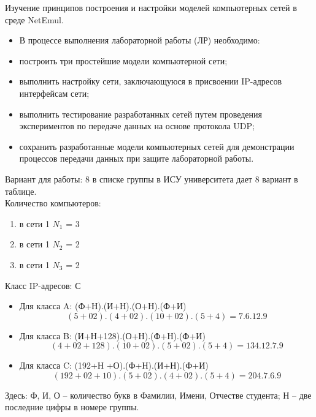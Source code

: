 


\tableofcontents


\newpage
\Chapter{\lab\ \labnumber}{\labtheme}{}

Изучение принципов построения и настройки моделей компьютерных 
сетей в среде NetEmul.
\begin{itemize}
    \item  В процессе выполнения лабораторной работы (ЛР) необходимо:
\item построить три простейшие модели компьютерной сети;
\item выполнить настройку сети, заключающуюся в присвоении IP-адресов 
интерфейсам сети;
\item выполнить тестирование разработанных сетей путем проведения 
экспериментов по передаче данных на основе протокола UDP;
\item сохранить разработанные модели компьютерных сетей для демонстрации 
процессов передачи данных при защите лабораторной работы. 
\end{itemize}


Вариант для работы: 8 в списке группы в ИСУ университета дает 8 вариант в таблице.\\

Количество компьютеров:
\begin{enumerate}
    \item в сети 1 $N_1$ = 3
    \item в сети 1 $N_2$ = 2
    \item в сети 1 $N_3$ = 2
\end{enumerate}

Класс IP-адресов:  С

\begin{itemize}
    \item Для класса A: (Ф+Н).(И+Н).(О+Н).(Ф+И)
$$
    (5+02).(4+02).(10+02).(5+4) = 7.6.12.9
$$
    \item Для класса B: (И+Н+128).(О+Н).(Ф+Н).(Ф+И)
$$
    (4+02+128).(10+02).(5+02).(5+4) = 134.12.7.9
$$
    \item Для класса C: (192+Н +О).(Ф+Н).(И+Н).(Ф+И)
$$
    (192+02+10).(5+02).(4+02).(5+4) = 204.7.6.9
$$
\end{itemize}
Здесь: Ф, И, О – количество букв в Фамилии, Имени, Отчестве студента;
Н – две последние цифры в номере группы.

